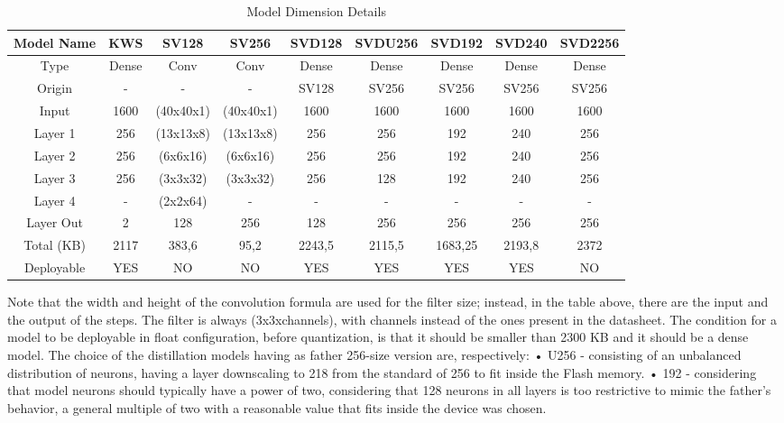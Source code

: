 \begin{table}[!h]
\centering
    \begin{tabular}{|c|c|c|c|c|c|c|c|c|}
        \hline
        Model Name & KWS & SV128 & SV256 & SVD128 & SVDU256 & SVD192 & SVD240 & SVD2256\\
        \hline
        Type & Dense & Conv & Conv & Dense & Dense & Dense & Dense & Dense\\
        Origin & - & - &  - & SV128 & SV256 & SV256 & SV256 & SV256\\
        Input & 1600 & (40x40x1) & (40x40x1) & 1600 & 1600 & 1600 & 1600 & 1600\\
        Layer 1 & 256 & (13x13x8) & (13x13x8) & 256 & 256 & 192 & 240 & 256\\
        Layer 2 & 256 & (6x6x16) & (6x6x16) & 256 & 256 & 192 & 240 & 256\\
        Layer 3 & 256 & (3x3x32) & (3x3x32) & 256 & 128 & 192 & 240 & 256\\
        Layer 4 & - & (2x2x64) & - & - & - & - & - & -\\
        Layer Out & 2 & 128 & 256 & 128 & 256 & 256 & 256 & 256\\
        Total (KB) & 2117 & 383,6 & 95,2 & 2243,5 & 2115,5 & 1683,25 & 2193,8 & 2372\\
        Deployable & YES & NO & NO & YES & YES & YES & YES & NO\\
        \hline
    \end{tabular}
    \caption{Model Dimension Details}
    \label{table:model sizes}
\end{table}
Note that the width and height of the convolution formula are used for the filter size; instead, in the table above, there are the input and the output of the steps. The filter is always (3x3xchannels), with channels instead of the ones present in the datasheet. The condition for a model to be deployable in float configuration, before quantization, is that it should be smaller than 2300 KB and it should be a dense model. The choice of the distillation models having as father 256-size version are, respectively:\newline
• U256 - consisting of an unbalanced distribution of neurons, having a layer downscaling to 218 from the standard of 256 to fit inside the Flash memory.\newline
• 192 - considering that model neurons should typically have a power of two, considering that 128 neurons in all layers is too restrictive to mimic the father's behavior, a general multiple of two with a reasonable value that fits inside the device was chosen.\newline
